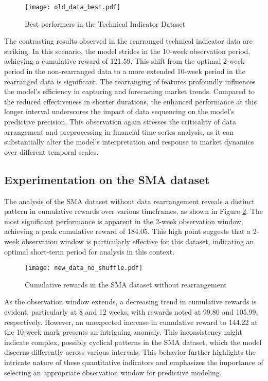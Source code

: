 \begin{figure}[ht]
    \centering
    \texttt{[image: old\_data\_best.pdf]}
    \caption{Best performers in the Technical Indicator Dataset}
    \label{fig:sma_nonrearranged}
\end{figure}

The contrasting results observed in the rearranged technical indicator data are striking. In this scenario, the model strides in the 10-week observation period, achieving a cumulative reward of 121.59. This shift from the optimal 2-week period in the non-rearranged data to a more extended 10-week period in the rearranged data is significant. The rearranging of features profoundly influences the model's efficiency in capturing and forecasting market trends. Compared to the reduced effectiveness in shorter durations, the enhanced performance at this longer interval underscores the impact of data sequencing on the model's predictive precision. This observation again stresses the criticality of data arrangement and preprocessing in financial time series analysis, as it can substantially alter the model's interpretation and response to market dynamics over different temporal scales. 

\subsection{Experimentation on the SMA dataset}
The analysis of the SMA dataset without data rearrangement reveals a distinct pattern in cumulative rewards over various timeframes, as shown in Figure \ref{fig:sma_rearranged}. The most significant performance is apparent in the 2-week observation window, achieving a peak cumulative reward of 184.05. This high point suggests that a 2-week observation window is particularly effective for this dataset, indicating an optimal short-term period for analysis in this context.

\begin{figure}[ht]
    \centering
    \texttt{[image: new\_data\_no\_shuffle.pdf]}
    \caption{Cumulative rewards in the SMA dataset without rearrangement}
    \label{fig:sma_rearranged}
\end{figure}

As the observation window extends, a decreasing trend in cumulative rewards is evident, particularly at 8 and 12 weeks, with rewards noted at 99.80 and 105.99, respectively. However, an unexpected increase in cumulative reward to 144.22 at the 10-week mark presents an intriguing anomaly. This inconsistency might indicate complex, possibly cyclical patterns in the SMA dataset, which the model discerns differently across various intervals. This behavior further highlights the intricate nature of these quantitative indicators and emphasizes the importance of selecting an appropriate observation window for predictive modeling.

